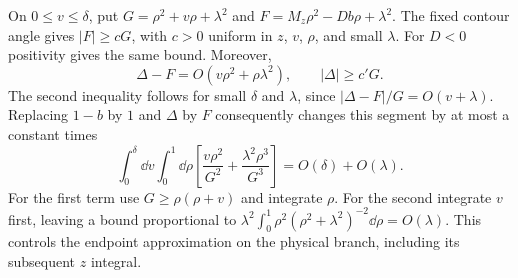 On $0\leq v\leq\delta$, put
$G=\rho^2+v\rho+\lambda^2$ and
$F=M_z\rho^2-Db\rho+\lambda^2$.
The fixed contour angle gives $|F|\geq cG$, with $c>0$ uniform in
$z$, $v$, $\rho$, and small $\lambda$. For $D<0$ positivity gives
the same bound. Moreover,
\begin{equation}
 \Delta-F=O(v\rho^2+\rho\lambda^2),\qquad
 |\Delta|\geq c'G.
\end{equation}
The second inequality follows for small $\delta$ and $\lambda$,
since $|\Delta-F|/G=O(v+\lambda)$.
Replacing $1-b$ by $1$ and $\Delta$ by $F$ consequently changes
this segment by at most a constant times
\begin{equation}
 \int_0^\delta\dd v\int_0^1\dd\rho
 \left[\frac{v\rho^2}{G^2}
       +\frac{\lambda^2\rho^3}{G^3}\right]
 =O(\delta)+O(\lambda).
\end{equation}
For the first term use $G\geq\rho(\rho+v)$ and integrate $\rho$.
For the second integrate $v$ first, leaving a bound proportional
to $\lambda^2\int_0^1\rho^2(\rho^2+\lambda^2)^{-2}\dd\rho=O(\lambda)$.
This controls the endpoint approximation on the physical branch,
including its subsequent $z$ integral.

